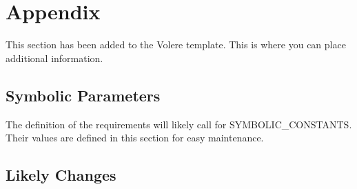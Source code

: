 \documentclass[12pt]{article}
\begin{document}
\newpage

\section{Appendix}

This section has been added to the Volere template.  This is where you can place
additional information.

\subsection{Symbolic Parameters}

The definition of the requirements will likely call for SYMBOLIC\_CONSTANTS.
Their values are defined in this section for easy maintenance.

\subsection{Likely Changes}
\end{document}
